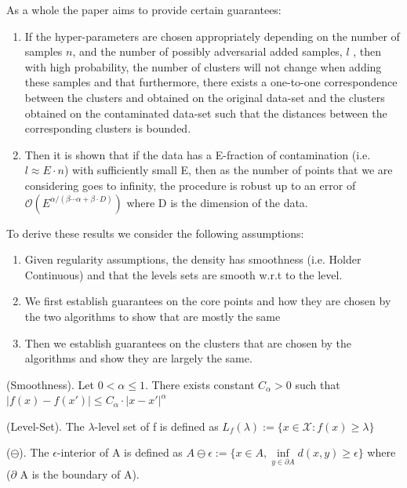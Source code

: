   
  As a whole the paper aims to provide certain guarantees:
  \begin{enumerate}
      \item If the hyper-parameters are chosen appropriately depending on the number of samples $n$, and the number of possibly adversarial added samples, $l$ , then with high probability, the number of clusters will not change when adding these samples and that furthermore, there exists a one-to-one correspondence between the clusters and obtained on the original data-set and the clusters obtained on the contaminated data-set such that the distances between the corresponding clusters is bounded. 
      \item Then it is shown that if the data has a E-fraction of contamination (i.e. $l \approx E \cdot n$) with sufficiently small E, then as the number of points that we are considering goes to infinity, the procedure is robust up to an error of $\mathcal{O}(E^{\alpha/(\beta\cdots\alpha+\beta\cdot D)})$  where D is the dimension of the data.
  \end{enumerate}
  
  To derive these results we consider the following assumptions:
  
  \begin{enumerate}
      \item Given regularity assumptions, the density has smoothness (i.e. Holder Continuous) and that the levels sets are smooth w.r.t to the level.
      \item We first establish guarantees on the core points and how they are chosen by the two algorithms to show that are mostly the same
      \item Then we establish guarantees on the clusters that are chosen by the algorithms and show they are largely the same.
  \end{enumerate}

\begin{remark} (Smoothness).
Let $0<\alpha\leq 1$. There exists constant $C_{\alpha}>0$ such that $|f(x)-f(x')|\leq C_{\alpha}\cdot|x-x'|^{\alpha}$
\end{remark}

\begin{remark} (Level-Set).
The $\lambda$-level set of f is defined as $L_f(\lambda) := \{ x \in \mathcal{X}: f(x)\geq \lambda \}$
\end{remark}

\begin{remark} ($\ominus$).
The $\epsilon$-interior of A is defined as $A \ominus \epsilon := \{ x \in A, \inf\limits_{y \in \partial A}d(x,y)\geq \epsilon \}$ where ($\partial$ A is the boundary of A).
\end{remark}

